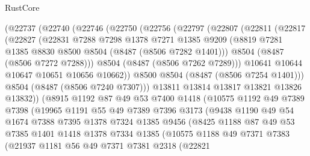 \begin{lexlean}{RustCore}
\begin{coremodule}
      (@22737
        (@22740
          (@22746
            (@22750
              (@22756
                (@22797
                  (@22807
                    (@22811
                      (@22817
                        (@22827
                          (@22831
                            @7288
                            @7298
                            @1378
                            @7271
                            @1385
                            @9209
                            (@8819 @7281 @1385 @8830 @8500 @8504 (@8487 (@8506 @7282 @1401)))
                            @8504
                            (@8487 (@8506 @7272 @7288)))
                          @8504
                          (@8487 (@8506 @7262 @7289)))
                        @10641
                        @10644
                        @10647
                        @10651
                        @10656
                        @10662))
                    @8500
                    @8504
                    (@8487 (@8506 @7254 @1401)))
                  @8504
                  (@8487 (@8506 @7240 @7307)))
                @13811
                @13814
                @13817
                @13821
                @13826
                @13832))
            (@8915
              @1192
              @87
              @49
              @53
              @7400
              @1418
              (@10575
                @1192
                @49
                @7389
                @7398
                (@19965
                  @1191
                  @55
                  @49
                  @7389
                  @7396
                  @3173
                  (@9438
                    @1190
                    @49
                    @54
                    @1674
                    @7388
                    @7395
                    @1378
                    @7324
                    @1385
                    @9456
                    (@8425
                      @1188
                      @87
                      @49
                      @53
                      @7385
                      @1401
                      @1418
                      @1378
                      @7334
                      @1385
                      (@10575
                        @1188
                        @49
                        @7371
                        @7383
                        (@21937
                          @1181
                          @56
                          @49
                          @7371
                          @7381
                          @2318
                          (@22821

\end{coremodule}
\end{lexlean}

